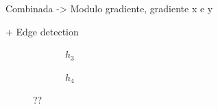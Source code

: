 
Combinada -> Modulo gradiente, gradiente x e y

+ Edge detection

\begin{figure}[H]
    \centering
    \begin{subfigure}{0.4\textwidth}
        \centering
        
        \caption{~$h_3$}
        \label{fig:h3}
    \end{subfigure}%
    \begin{subfigure}{0.4\textwidth}
        \centering
        
        \caption{~$h_4$}
        \label{fig:h4}
    \end{subfigure}

    \caption{??}
    \label{fig:sobel:kernel}
\end{figure}

